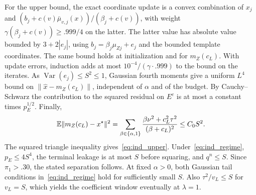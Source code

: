 For the upper bound, the exact coordinate update is a convex combination
of $x_j$ and $(b_j+c(v)\bar\mu_{v,j}(x))/(\beta_j+c(v))$, with weight
$\gamma(\beta_j+c(v))\ge .999/4$ on the latter.
The latter value has absolute value bounded by $3+2|e_j|$, using
$b_j=\beta_j\mu_{Zj}+e_j$ and the bounded template coordinates.
The same bound holds at initialization and for $m_Z(c_L)$.
With update errors, induction adds at most $10^{-4}/(\gamma\cdot.999)$
to the bound on the iterates. As $\operatorname{Var}(e_j)\le S^2\le1$,
Gaussian fourth moments give a uniform $L^4$ bound on
$\|\widehat x-m_Z(c_L)\|$, independent of $\alpha$ and of the budget.
By Cauchy--Schwarz the contribution to the squared residual on $E^c$
is at most a constant times $p_E^{1/2}$.
Finally,
\[
 \mathbb E\lVert m_Z(c_L)-x^\star\rVert^2
   =\sum_{\beta\in\{\alpha,1\}}
     \frac{\beta\nu^2+c_L^2\tau^2}{(\beta+c_L)^2}
   \le C_0 S^2 .
\]
The squared triangle inequality gives~\eqref{eq:ind_upper}.
Under~\eqref{eq:ind_regime}, $p_E\le4S^4$, the terminal leakage is at most
$S$ before squaring, and $q^n\le S$. Since $\pi_1>.30$, the stated
separation follows. At fixed $\alpha>0$, both Gaussian tail conditions
in~\eqref{eq:ind_regime} hold for sufficiently small $S$. Also $\tau^2/v_L\le S$ for $v_L=S$, which yields the coefficient window
eventually at $\lambda=1$.

